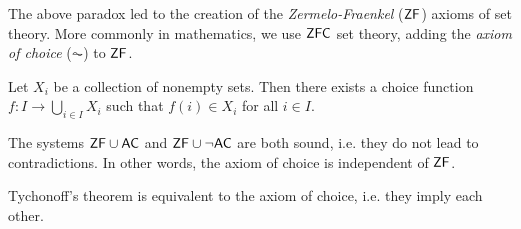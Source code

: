 \begin{remark}
  The above paradox led to the creation of
  the \emph{Zermelo-Fraenkel} ($\mathsf{ZF}$) axioms of set
  theory. More commonly in mathematics, we use $\mathsf{ZFC}$
  set theory, adding the \emph{axiom of choice} ($\AC$) to
  $\mathsf{ZF}$.
\end{remark}

\begin{axiom}
  Let $X_i$ be a collection of nonempty sets. Then
  there exists
  a choice function $f : I \to \bigcup_{i \in I} X_i$
  such that $f(i) \in X_i$ for all $i \in I$.
\end{axiom}

\begin{theorem}[P. Cohen]
  The systems $\mathsf{ZF} \cup \mathsf{AC}$ and
  $\mathsf{ZF} \cup \neg \mathsf{AC}$ are both sound, i.e.
  they do not lead to contradictions. In other words,
  the axiom of choice is independent of $\mathsf{ZF}$.
\end{theorem}

\begin{theorem}
  Tychonoff's theorem is equivalent to the axiom of
  choice, i.e.
  they imply each other.
\end{theorem}
